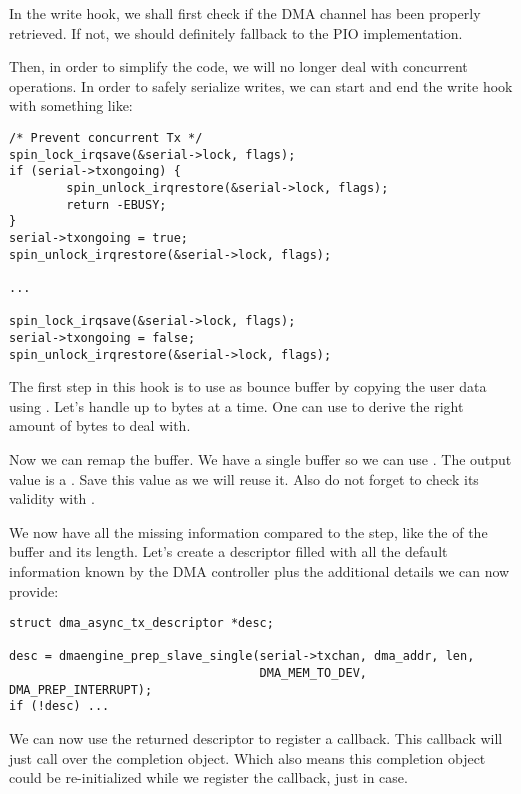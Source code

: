 In the write hook, we shall first check if the DMA channel has been
properly retrieved. If not, we should definitely fallback to the PIO
implementation.

Then, in order to simplify the code, we will no longer deal with
concurrent operations. In order to safely serialize writes, we can start
and end the write hook with something like:

\begin{verbatim}
/* Prevent concurrent Tx */
spin_lock_irqsave(&serial->lock, flags);
if (serial->txongoing) {
        spin_unlock_irqrestore(&serial->lock, flags);
        return -EBUSY;
}
serial->txongoing = true;
spin_unlock_irqrestore(&serial->lock, flags);

...

spin_lock_irqsave(&serial->lock, flags);
serial->txongoing = false;
spin_unlock_irqrestore(&serial->lock, flags);
\end{verbatim}

The first step in this  hook is to use  as
bounce buffer by copying the user data using . Let's
handle up to  bytes at a time. One can use 
to derive the right amount of bytes to deal with.

Now we can remap the buffer. We have a single buffer so we can use
. The output value is a . Save this
value as we will reuse it. Also do not forget to check its validity with
.

We now have all the missing information compared to the 
step, like the  of the buffer and its length. Let's create a
descriptor filled with all the default information known by the DMA controller
plus the additional details we can now provide:

\begin{verbatim}
struct dma_async_tx_descriptor *desc;

desc = dmaengine_prep_slave_single(serial->txchan, dma_addr, len,
                                   DMA_MEM_TO_DEV, DMA_PREP_INTERRUPT);
if (!desc) ...
\end{verbatim}

We can now use the returned descriptor to register a callback. This callback
will just call  over the completion object. Which also means
this completion object could be re-initialized while we register the callback,
just in case.

